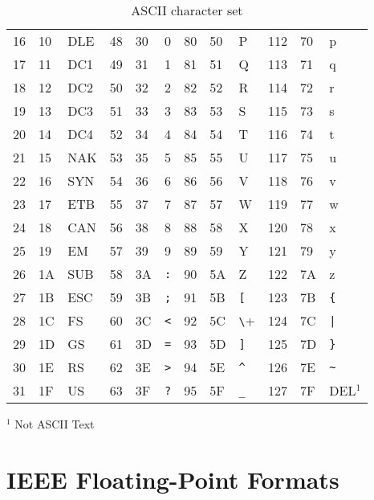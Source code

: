 \documentclass[11pt,makeidx]{book}     %
\begin{document}
\begin{table}[hb]
\begin{center}
\begin{tabular}{|lll||lll|lll|lll|}
      \\ 
16 & 10 & DLE & 48 & 30 & 0        & 80 & 50 & P        &112 & 70 & p  
     \\ 
17 & 11 & DC1 & 49 & 31 & 1        & 81 & 51 & Q        &113 & 71 & q  
     \\ 
18 & 12 & DC2 & 50 & 32 & 2        & 82 & 52 & R        &114 & 72 & r   
    \\ 
19 & 13 & DC3 & 51 & 33 & 3        & 83 & 53 & S        &115 & 73 & s   
    \\ 
20 & 14 & DC4 & 52 & 34 & 4        & 84 & 54 & T        &116 & 74 & t   
    \\ 
21 & 15 & NAK & 53 & 35 & 5        & 85 & 55 & U        &117 & 75 & u  
     \\ 
22 & 16 & SYN & 54 & 36 & 6        & 86 & 56 & V        &118 & 76 & v   
    \\ 
23 & 17 & ETB & 55 & 37 & 7        & 87 & 57 & W        &119 & 77 & w 
      \\ 
24 & 18 & CAN & 56 & 38 & 8        & 88 & 58 & X        &120 & 78 & x   
    \\ 
25 & 19 & EM  & 57 & 39 & 9        & 89 & 59 & Y        &121 & 79 & y   
    \\ 
26 & 1A & SUB & 58 & 3A & \verb+:+ & 90 & 5A & Z        &122 & 7A &
z        \\ 
27 & 1B & ESC & 59 & 3B & \verb+;+ & 91 & 5B & \verb+[+ &123 & 7B
& \verb+{+ \\ 
28 & 1C & FS  & 60 & 3C & \verb+<+ & 92 & 5C & \verb+\+ &124 & 7C
& \verb+|+ \\ 
29 & 1D & GS  & 61 & 3D & \verb+=+ & 93 & 5D & \verb+]+ &125 & 7D
& \verb+}+ \\ 
30 & 1E & RS  & 62 & 3E & \verb+>+ & 94 & 5E & \verb+^+ &126 &
7E & \verb+~+ \\ 
31 & 1F & US  & 63 & 3F & \verb+?+ & 95 & 5F & \verb+_+ &127 & 7F
& DEL$^{1}$ \\
\hline                            
\end{tabular}                     
\end{center} 
$^1$ Not ASCII Text                     
\caption[ASCII character set]{ASCII character set}  
\label{t:ascii}                   
\end{table}                       


\chapter{IEEE Floating-Point Formats}
   \label{s:IEEE754}
\end{document}
